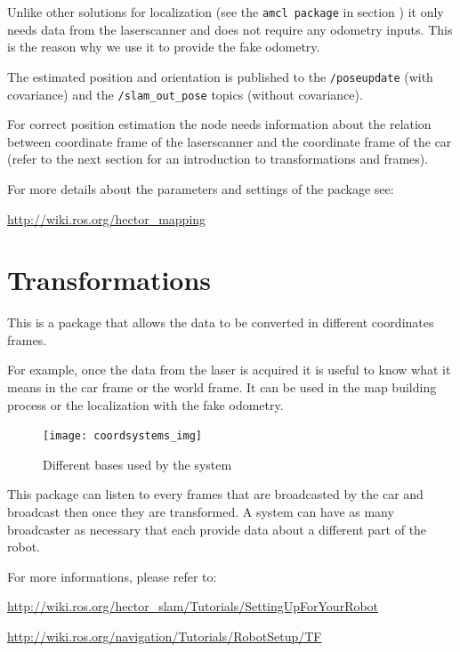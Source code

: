 Unlike other solutions for localization (see the \texttt{amcl package} in section ) it only needs data from the laserscanner and does not require any odometry inputs. This is the reason why we use it to provide the fake odometry.

The estimated position and orientation is published to the \texttt{/poseupdate} (with covariance) and the \texttt{/slam\_out\_pose} topics (without covariance). 
 
For correct position estimation the node needs information about the relation between coordinate frame of the laserscanner and the coordinate frame of the car (refer to the next section  for an introduction to transformations and frames).

For more details about the parameters and settings of the package see:

\hyperref[http://wiki.ros.org/hector_mapping]{http://wiki.ros.org/hector\_mapping}

\section{Transformations}
\label{sec:tas_package_transformations}

This is a package that allows the data to be converted in different coordinates frames. 

For example, once the data from the laser is acquired it is useful to know what it means in the car frame or the world frame. It can be used in the map building process or the localization with the fake odometry.

\begin{figure}[h]
	\centering
		\texttt{[image: coordsystems\_img]}
	\caption{Different bases used by the system}
	\label{fig:Base transformations}
\end{figure}

This package can listen to every frames that are broadcasted by the car and broadcast then once they are transformed. A system can have as many broadcaster as necessary that each provide data about a different part of the robot.

For more informations, please refer to:

\hyperref[http://wiki.ros.org/hector_slam/Tutorials/SettingUpForYourRobot]{http://wiki.ros.org/hector\_slam/Tutorials/SettingUpForYourRobot}

\hyperref[http://wiki.ros.org/navigation/Tutorials/RobotSetup/TF]{http://wiki.ros.org/navigation/Tutorials/RobotSetup/TF}



